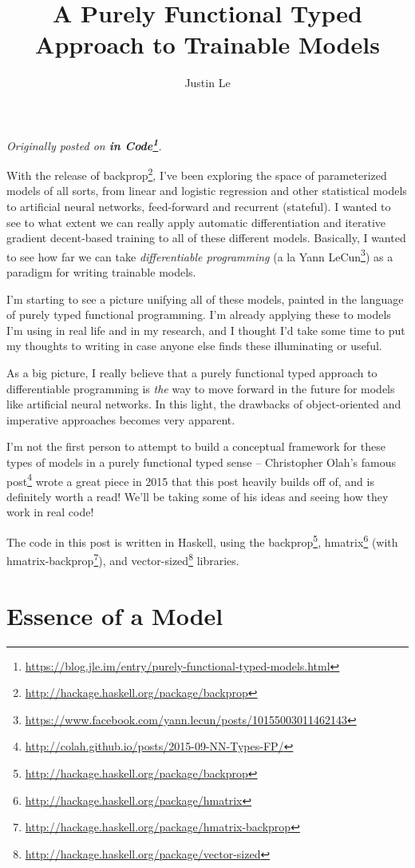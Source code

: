 \documentclass[]{article}
\title{A Purely Functional Typed Approach to Trainable Models}
\author{Justin Le}
\renewcommand{\href}[2]{#2\footnote{\url{#1}}}
\begin{document}
\maketitle

\emph{Originally posted on
\textbf{\href{https://blog.jle.im/entry/purely-functional-typed-models.html}{in
Code}}.}

With the release of
\href{http://hackage.haskell.org/package/backprop}{backprop}, I've been
exploring the space of parameterized models of all sorts, from linear and
logistic regression and other statistical models to artificial neural networks,
feed-forward and recurrent (stateful). I wanted to see to what extent we can
really apply automatic differentiation and iterative gradient decent-based
training to all of these different models. Basically, I wanted to see how far we
can take \emph{differentiable programming} (a la
\href{https://www.facebook.com/yann.lecun/posts/10155003011462143}{Yann LeCun})
as a paradigm for writing trainable models.

I'm starting to see a picture unifying all of these models, painted in the
language of purely typed functional programming. I'm already applying these to
models I'm using in real life and in my research, and I thought I'd take some
time to put my thoughts to writing in case anyone else finds these illuminating
or useful.

As a big picture, I really believe that a purely functional typed approach to
differentiable programming is \emph{the} way to move forward in the future for
models like artificial neural networks. In this light, the drawbacks of
object-oriented and imperative approaches becomes very apparent.

I'm not the first person to attempt to build a conceptual framework for these
types of models in a purely functional typed sense --
\href{http://colah.github.io/posts/2015-09-NN-Types-FP/}{Christopher Olah's
famous post} wrote a great piece in 2015 that this post heavily builds off of,
and is definitely worth a read! We'll be taking some of his ideas and seeing how
they work in real code!

The code in this post is written in Haskell, using the
\href{http://hackage.haskell.org/package/backprop}{backprop},
\href{http://hackage.haskell.org/package/hmatrix}{hmatrix} (with
\href{http://hackage.haskell.org/package/hmatrix-backprop}{hmatrix-backprop}),
and \href{http://hackage.haskell.org/package/vector-sized}{vector-sized}
libraries.

\hypertarget{essence-of-a-model}{%
\section{Essence of a Model}\label{essence-of-a-model}}
\end{document}
